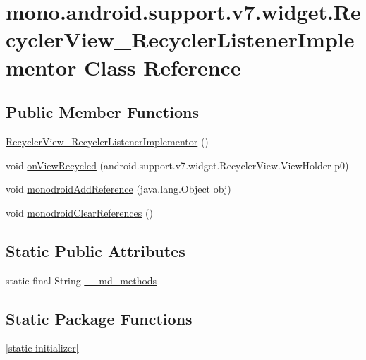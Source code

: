 \hypertarget{classmono_1_1android_1_1support_1_1v7_1_1widget_1_1_recycler_view___recycler_listener_implementor}{
\section{mono.android.support.v7.widget.RecyclerView\_\-RecyclerListenerImplementor Class Reference}
\label{classmono_1_1android_1_1support_1_1v7_1_1widget_1_1_recycler_view___recycler_listener_implementor}
}
\subsection*{Public Member Functions}
\begin{CompactItemize}
\item 
\hyperlink{classmono_1_1android_1_1support_1_1v7_1_1widget_1_1_recycler_view___recycler_listener_implementor_faa895f4a195a43055b9f9e921470743}{RecyclerView\_\-RecyclerListenerImplementor} ()
\item 
void \hyperlink{classmono_1_1android_1_1support_1_1v7_1_1widget_1_1_recycler_view___recycler_listener_implementor_5454da38aec32481ec8ce7f5150d064d}{onViewRecycled} (android.support.v7.widget.RecyclerView.ViewHolder p0)
\item 
void \hyperlink{classmono_1_1android_1_1support_1_1v7_1_1widget_1_1_recycler_view___recycler_listener_implementor_47b5f1d0a3a4ddc09d2f8a1727069ad8}{monodroidAddReference} (java.lang.Object obj)
\item 
void \hyperlink{classmono_1_1android_1_1support_1_1v7_1_1widget_1_1_recycler_view___recycler_listener_implementor_70d9d815893736085322f6ed97dfad5e}{monodroidClearReferences} ()
\end{CompactItemize}
\subsection*{Static Public Attributes}
\begin{CompactItemize}
\item 
static final String \hyperlink{classmono_1_1android_1_1support_1_1v7_1_1widget_1_1_recycler_view___recycler_listener_implementor_a5a0aa7a98140d109a11d924d7dbd6aa}{\_\-\_\-md\_\-methods}
\end{CompactItemize}
\subsection*{Static Package Functions}
\begin{CompactItemize}
\item 
\hyperlink{classmono_1_1android_1_1support_1_1v7_1_1widget_1_1_recycler_view___recycler_listener_implementor_627aea0bf66477eec1df0e4edb43fcfb}{\mbox{[}static initializer\mbox{]}}
\end{CompactItemize}
